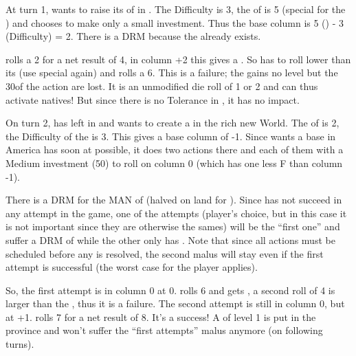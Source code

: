 \begin{exemple}
  At turn 1, \POR wants to raise its \COL of  in
  . The Difficulty is 3, the \FTI of \POR is 5
  (special \FTI for the \ROTW) and \POR chooses to make only a small
  investment. Thus the base column is 5 (\FTI) - 3 (Difficulty) = 2. There is
  a  DRM because the \COL already exists.

  \POR rolls a 2 for a net result of 4, in column +2 this gives a \undemi. So
  \POR has to roll lower than its \FTI (use special \FTI again) and rolls a
  6. This is a failure; the \COL gains no level but the 30\ducats of the
  action are lost. It is an unmodified die roll of 1 or 2 and can thus
  activate natives! But since there is no Tolerance in , it has no impact.

  \smallskip

  On turn 2, \HIS has left  in \granderegionCuba and
  wants to create a \COL in the rich new World. The \FTI of \HIS is 2, the
  Difficulty of the \Area is 3. This gives a base column of -1. Since \HIS
  wants a base in America has soon at possible, it does two \COL actions there
  and each of them with a Medium investment (50\ducats) to roll on column 0
  (which has one less F than column -1).

  There is a  DRM for the MAN of \leaderColon (halved on land for
  \LeaderE). Since \HIS has not succeed in any \COL attempt in the game, one
  of the attempts (player's choice, but in this case it is not important since
  they are otherwise the sames) will be the ``first one'' and suffer a DRM of
   while the other only has . Note that since all actions
  must be scheduled before any is resolved, the second malus will stay even if
  the first attempt is successful (the worst case for the player applies).

  So, the first attempt is in column 0 at 0. \HIS rolls 6 and gets \undemi, a
  second roll of 4 is larger than the \FTI, thus it is a failure. The second
  attempt is still in column 0, but at +1. \HIS rolls 7 for a net result of
  8. It's a success! A \COL of level 1 is put in the province and \HIS won't
  suffer the ``first attempts'' malus anymore (on following turns).
\end{exemple}

